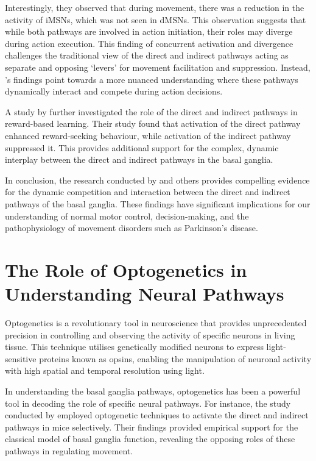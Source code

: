 \documentclass[10pt]{article}
\begin{document}
\begin{sloppypar}
  Interestingly, they observed that during movement, there was a reduction in the activity of iMSNs, which was not seen in dMSNs. This observation suggests that while both pathways are involved in action initiation, their roles may diverge during action execution. This finding of concurrent activation and divergence challenges the traditional view of the direct and indirect pathways acting as separate and opposing ‘levers’ for movement facilitation and suppression. Instead, \citeauthor{cui_concurrent_2013}’s findings point towards a more nuanced understanding where these pathways dynamically interact and compete during action decisions.

  A study by \cite{guillaumin_optogenetic_2020} further investigated the role of the direct and indirect pathways in reward-based learning. Their study found that activation of the direct pathway enhanced reward-seeking behaviour, while activation of the indirect pathway suppressed it. This provides additional support for the complex, dynamic interplay between the direct and indirect pathways in the basal ganglia.

  In conclusion, the research conducted by \citeauthor{cui_concurrent_2013} and others provides compelling evidence for the dynamic competition and interaction between the direct and indirect pathways of the basal ganglia. These findings have significant implications for our understanding of normal motor control, decision-making, and the pathophysiology of movement disorders such as Parkinson’s disease.

  \section{The Role of Optogenetics in Understanding Neural Pathways}
  \label{sec:the-role-of-optogenetics-in-understanding-neural-pathways}

  Optogenetics is a revolutionary tool in neuroscience that provides unprecedented precision in controlling and observing the activity of specific neurons in living tissue. This technique utilises genetically modified neurons to express light-sensitive proteins known as opsins, enabling the manipulation of neuronal activity with high spatial and temporal resolution using light.

  In understanding the basal ganglia pathways, optogenetics has been a powerful tool in decoding the role of specific neural pathways. For instance, the study conducted by \cite{kravitz_regulation_2010} employed optogenetic techniques to activate the direct and indirect pathways in mice selectively. Their findings provided empirical support for the classical model of basal ganglia function, revealing the opposing roles of these pathways in regulating movement.


\end{sloppypar}
\end{document}

